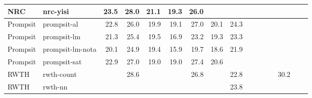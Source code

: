 \begin{table*}
\begin{center}
\begin{tabular}{|l|l|rrrrrrr|rrrrrrr|}
NRC & nrc-yisi & 23.5 & 28.0 & 21.1 & 19.3 & 26.0 & \cellcolor{lightyellow}{21.8} & \cellcolor{lightyellow}{25.0} & \cellcolor{lightgreen}{26.4} & \cellcolor{lightgreen}{31.0} & \cellcolor{green}{23.2} & \cellcolor{green}{22.5} & \cellcolor{lightyellow}{30.8} & \cellcolor{lightgreen}{23.9} & \cellcolor{lightgreen}{26.8} \\ \hline
Prompsit & prompsit-al & 22.8 & 26.0 & 19.9 & 19.1 & 27.0 & 20.1 & 24.3 & \cellcolor{lightgreen}{26.4} & \cellcolor{lightgreen}{31.2} & \cellcolor{lightgreen}{22.8} & \cellcolor{green}{22.5} & \cellcolor{lightgreen}{31.3} & \cellcolor{lightgreen}{23.8} & \cellcolor{green}{26.9} \\ \hline
Prompsit & prompsit-lm & 21.3 & 25.4 & 19.5 & 16.9 & 23.2 & 19.3 & 23.3 & \cellcolor{lightgreen}{26.3} & \cellcolor{lightgreen}{31.1} & \cellcolor{lightgreen}{22.8} & \cellcolor{green}{22.5} & \cellcolor{lightgreen}{31.0} & \cellcolor{lightgreen}{23.6} & \cellcolor{lightgreen}{26.6} \\ \hline
Prompsit & prompsit-lm-nota & 20.1 & 24.9 & 19.4 & 15.9 & 19.7 & 18.6 & 21.9 & \cellcolor{lightgreen}{26.2} & \cellcolor{lightgreen}{31.0} & \cellcolor{lightgreen}{22.9} & \cellcolor{lightgreen}{22.2} & \cellcolor{lightyellow}{30.9} & \cellcolor{lightyellow}{23.5} & \cellcolor{lightgreen}{26.5} \\ \hline
Prompsit & prompsit-sat & 22.9 & 27.0 & 19.0 & 19.0 & 27.4 & 20.6 & \cellcolor{lightyellow}{24.6} & \cellcolor{lightgreen}{26.3} & \cellcolor{lightgreen}{31.0} & \cellcolor{lightgreen}{22.8} & \cellcolor{green}{22.5} & \cellcolor{lightgreen}{31.1} & \cellcolor{lightgreen}{23.6} & \cellcolor{green}{26.9} \\ \hline
RWTH & rwth-count & \cellcolor{lightyellow}{23.9} & 28.6 & \cellcolor{lightgreen}{21.8} & \cellcolor{lightgreen}{21.0} & 26.8 & \cellcolor{lightyellow}{22.0} & 22.8 & \cellcolor{lightyellow}{25.9} & \cellcolor{lightyellow}{30.7} & \cellcolor{lightgreen}{22.9} & \cellcolor{lightyellow}{22.0} & 30.2 & \cellcolor{lightyellow}{23.5} & \cellcolor{lightyellow}{26.3} \\ \hline
RWTH & rwth-nn & \cellcolor{lightgreen}{24.5} & \cellcolor{green}{29.6} & \cellcolor{lightgreen}{21.8} & \cellcolor{green}{21.4} & \cellcolor{lightyellow}{28.0} & \cellcolor{green}{22.7} & 23.8 & \cellcolor{lightgreen}{26.2} & \cellcolor{lightyellow}{30.8} & \cellcolor{green}{23.2} & \cellcolor{lightgreen}{22.2} & \cellcolor{lightyellow}{30.9} & \cellcolor{lightyellow}{23.4} & \cellcolor{lightgreen}{26.6} \\ \hline

\end{tabular}
\end{center}
\end{table*}
